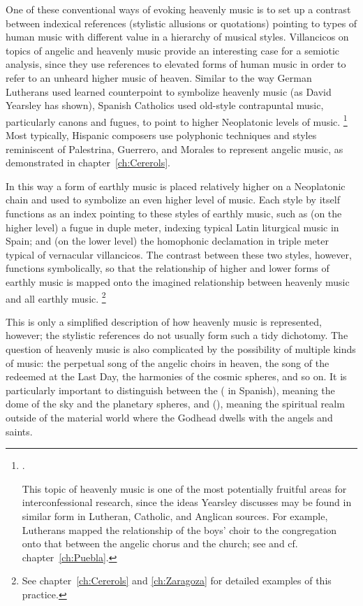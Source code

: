 One of these conventional ways of evoking heavenly music is to set up a contrast between indexical references (stylistic allusions or quotations) pointing to types of human music with different value in a hierarchy of musical styles.
Villancicos on topics of angelic and heavenly music provide an interesting case for a semiotic analysis, since they use references to elevated forms of human music in order to refer to an unheard higher music of heaven.
Similar to the way German Lutherans used learned counterpoint to symbolize heavenly music (as David Yearsley has shown), Spanish Catholics used old-style contrapuntal music, particularly canons and fugues, to point to higher Neoplatonic levels of music.%
	\footnote{%
\autocites{Yearsley:Buxtehude}{Yearsley:BachThron}.

This topic of heavenly music is one of the most potentially fruitful areas for interconfessional research, since the ideas Yearsley discusses may be found in similar form in Lutheran, Catholic, and Anglican sources. 
For example, Lutherans mapped the relationship of the boys' choir to the congregation onto that between the angelic chorus and the church; see \autocite{Cashner:Gerhardt} and cf. chapter~\ref{ch:Puebla}.
	}
Most typically, Hispanic composers use polyphonic techniques and styles reminiscent of Palestrina, Guerrero, and Morales to represent angelic music, as demonstrated in chapter~\ref{ch:Cererols}.

In this way a form of earthly music is placed relatively higher on a Neoplatonic chain and used to symbolize an even higher level of music. 
Each style by itself functions as an index pointing to these styles of earthly music, such as (on the higher level) a fugue in duple meter, indexing typical Latin liturgical music in Spain; and (on the lower level) the homophonic declamation in triple meter typical of vernacular villancicos.
The contrast between these two styles, however, functions symbolically, so that the relationship of higher and lower forms of earthly music is mapped onto the imagined relationship between heavenly music and all earthly music.%
	\footnote{%
	See chapter~\ref{ch:Cererols} and \ref{ch:Zaragoza} for detailed examples of this practice.
	}

This is only a simplified description of how heavenly music is represented, however; the stylistic references do not usually form such a tidy dichotomy.
The question of heavenly music is also complicated by the possibility of multiple kinds of  music: the perpetual song of the angelic choirs in heaven, the song of the redeemed at the Last Day, the harmonies of the cosmic spheres, and so on.
It is particularly important to distinguish between the  ( in Spanish), meaning the dome of the sky and the planetary spheres, and  (), meaning the spiritual realm outside of the material world where the Godhead dwells with the angels and saints.

